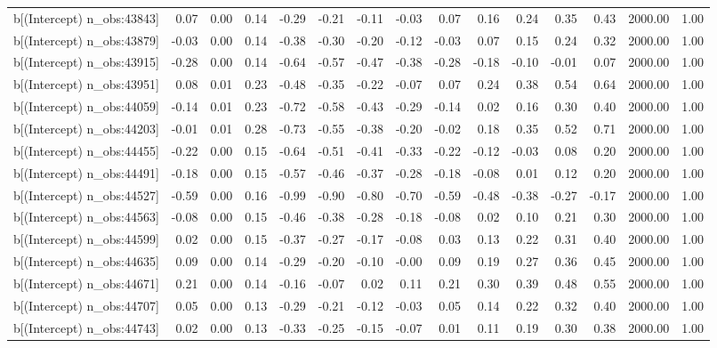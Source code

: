 \begin{table}[ht]
\begin{tabular}{rrrrrrrrrrrrrrr}
  b[(Intercept) n\_obs:43843] & 0.07 & 0.00 & 0.14 & -0.29 & -0.21 & -0.11 & -0.03 & 0.07 & 0.16 & 0.24 & 0.35 & 0.43 & 2000.00 & 1.00 \\ 
  b[(Intercept) n\_obs:43879] & -0.03 & 0.00 & 0.14 & -0.38 & -0.30 & -0.20 & -0.12 & -0.03 & 0.07 & 0.15 & 0.24 & 0.32 & 2000.00 & 1.00 \\ 
  b[(Intercept) n\_obs:43915] & -0.28 & 0.00 & 0.14 & -0.64 & -0.57 & -0.47 & -0.38 & -0.28 & -0.18 & -0.10 & -0.01 & 0.07 & 2000.00 & 1.00 \\ 
  b[(Intercept) n\_obs:43951] & 0.08 & 0.01 & 0.23 & -0.48 & -0.35 & -0.22 & -0.07 & 0.07 & 0.24 & 0.38 & 0.54 & 0.64 & 2000.00 & 1.00 \\ 
  b[(Intercept) n\_obs:44059] & -0.14 & 0.01 & 0.23 & -0.72 & -0.58 & -0.43 & -0.29 & -0.14 & 0.02 & 0.16 & 0.30 & 0.40 & 2000.00 & 1.00 \\ 
  b[(Intercept) n\_obs:44203] & -0.01 & 0.01 & 0.28 & -0.73 & -0.55 & -0.38 & -0.20 & -0.02 & 0.18 & 0.35 & 0.52 & 0.71 & 2000.00 & 1.00 \\ 
  b[(Intercept) n\_obs:44455] & -0.22 & 0.00 & 0.15 & -0.64 & -0.51 & -0.41 & -0.33 & -0.22 & -0.12 & -0.03 & 0.08 & 0.20 & 2000.00 & 1.00 \\ 
  b[(Intercept) n\_obs:44491] & -0.18 & 0.00 & 0.15 & -0.57 & -0.46 & -0.37 & -0.28 & -0.18 & -0.08 & 0.01 & 0.12 & 0.20 & 2000.00 & 1.00 \\ 
  b[(Intercept) n\_obs:44527] & -0.59 & 0.00 & 0.16 & -0.99 & -0.90 & -0.80 & -0.70 & -0.59 & -0.48 & -0.38 & -0.27 & -0.17 & 2000.00 & 1.00 \\ 
  b[(Intercept) n\_obs:44563] & -0.08 & 0.00 & 0.15 & -0.46 & -0.38 & -0.28 & -0.18 & -0.08 & 0.02 & 0.10 & 0.21 & 0.30 & 2000.00 & 1.00 \\ 
  b[(Intercept) n\_obs:44599] & 0.02 & 0.00 & 0.15 & -0.37 & -0.27 & -0.17 & -0.08 & 0.03 & 0.13 & 0.22 & 0.31 & 0.40 & 2000.00 & 1.00 \\ 
  b[(Intercept) n\_obs:44635] & 0.09 & 0.00 & 0.14 & -0.29 & -0.20 & -0.10 & -0.00 & 0.09 & 0.19 & 0.27 & 0.36 & 0.45 & 2000.00 & 1.00 \\ 
  b[(Intercept) n\_obs:44671] & 0.21 & 0.00 & 0.14 & -0.16 & -0.07 & 0.02 & 0.11 & 0.21 & 0.30 & 0.39 & 0.48 & 0.55 & 2000.00 & 1.00 \\ 
  b[(Intercept) n\_obs:44707] & 0.05 & 0.00 & 0.13 & -0.29 & -0.21 & -0.12 & -0.03 & 0.05 & 0.14 & 0.22 & 0.32 & 0.40 & 2000.00 & 1.00 \\ 
  b[(Intercept) n\_obs:44743] & 0.02 & 0.00 & 0.13 & -0.33 & -0.25 & -0.15 & -0.07 & 0.01 & 0.11 & 0.19 & 0.30 & 0.38 & 2000.00 & 1.00 \\ 

\end{tabular}
\end{table}
